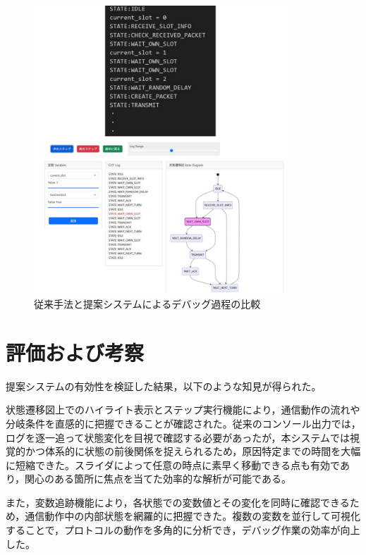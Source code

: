 \documentclass[technicalreport]{ieicej}
\begin{document}
\begin{figure}[h]
  \centering
  \includegraphics[width=95mm]{./images/3_debug_comparison.pdf}
  \caption{従来手法と提案システムによるデバッグ過程の比較}
  \label{fig:debug-comparison}
\end{figure}




\section{評価および考察}
提案システムの有効性を検証した結果，以下のような知見が得られた。

状態遷移図上でのハイライト表示とステップ実行機能により，通信動作の流れや分岐条件を直感的に把握できることが確認された。従来のコンソール出力では，ログを逐一追って状態変化を目視で確認する必要があったが，本システムでは視覚的かつ体系的に状態の前後関係を捉えられるため，原因特定までの時間を大幅に短縮できた。スライダによって任意の時点に素早く移動できる点も有効であり，関心のある箇所に焦点を当てた効率的な解析が可能である。

また，変数追跡機能により，各状態での変数値とその変化を同時に確認できるため，通信動作中の内部状態を網羅的に把握できた。複数の変数を並行して可視化することで，プロトコルの動作を多角的に分析でき，デバッグ作業の効率が向上した。
\end{document}

